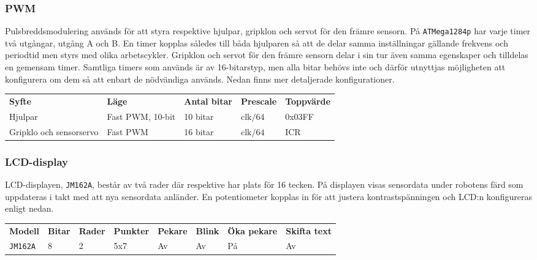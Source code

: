 \documentclass[11pt]{article}
\begin{document}
\begin{flushleft}
\begin{description}[style=unboxed, leftmargin=0cm]
\end{description}


\subsubsection{PWM}
Pulsbreddsmodulering används för att styra respektive hjulpar, gripklon och servot för den främre sensorn. På \verb+ATMega1284p+ har varje timer två utgångar, utgång A och B. En timer kopplas således till båda hjulparen så att de delar samma inställningar gällande frekvens och periodtid men styrs med olika arbetscykler. Gripklon och servot för den främre sensorn delar i sin tur även samma egenskaper och tilldelas en gemensam timer. Samtliga timers som används är av 16-bitarstyp, men alla bitar behövs inte och därför utnyttjas möjligheten att konfigurera om dem så att enbart de nödvändiga används. Nedan finns mer detaljerade konfigurationer. 

\begin{center}
\begin{tabular}{l l l l l}

    \textbf{Syfte} & \textbf{Läge} & \textbf{Antal bitar} & \textbf{Prescale} & \textbf{Toppvärde} \\
    Hjulpar & Fast PWM, 10-bit & 10 bitar & $\text{clk}/64$ &  0x03FF \\
	Gripklo och sensorservo & Fast PWM & 16 bitar & $\text{clk}/64$  & ICR \\
\end{tabular}
\end{center}

\subsubsection{LCD-display}
LCD-displayen, \verb+JM162A+, består av två rader där respektive har plats för 16 tecken. På displayen visas sensordata under robotens färd som uppdateras i takt med att nya sensordata anländer. En potentiometer kopplas in för att justera kontrastspänningen och LCD:n konfigureras enligt nedan.

\begin{center}
  \begin{tabular}{l l l l l l l l}
      \textbf{Modell} & \textbf{Bitar} & \textbf{Rader} & \textbf{Punkter} & \textbf{Pekare} & \textbf{Blink} & \textbf{Öka pekare} & \textbf{Skifta text} \\
      \verb+JM162A+ & 8 & 2 & 5x7 & Av & Av & På & Av \\
    \end{tabular}
  \end{center}


\end{flushleft}
\end{document}
